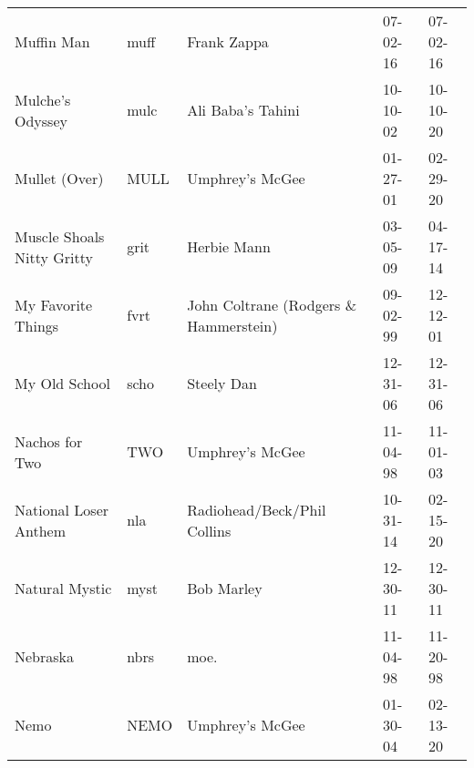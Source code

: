 \begin{longtable}{p{}p{}p{}p{}p{}}
                                                              Muffin Man &          muff &                                              Frank Zappa &              07-02-16 &             07-02-16 \\
                                                        Mulche's Odyssey &          mulc &                                        Ali Baba's Tahini &              10-10-02 &             10-10-20 \\
                                                           Mullet (Over) &          MULL &                                          Umphrey's McGee &              01-27-01 &             02-29-20 \\
                                              Muscle Shoals Nitty Gritty &          grit &                                              Herbie Mann &              03-05-09 &             04-17-14 \\
                                                      My Favorite Things &          fvrt &                   John Coltrane (Rodgers \& Hammerstein) &              09-02-99 &             12-12-01 \\
                                                           My Old School &          scho &                                               Steely Dan &              12-31-06 &             12-31-06 \\
                                                          Nachos for Two &           TWO &                                          Umphrey's McGee &              11-04-98 &             11-01-03 \\
                                                   National Loser Anthem &           nla &                              Radiohead/Beck/Phil Collins &              10-31-14 &             02-15-20 \\
                                                          Natural Mystic &          myst &                                               Bob Marley &              12-30-11 &             12-30-11 \\
                                                                Nebraska &          nbrs &                                                     moe. &              11-04-98 &             11-20-98 \\
                                                                    Nemo &          NEMO &                                          Umphrey's McGee &              01-30-04 &             02-13-20 \\

\end{longtable}
